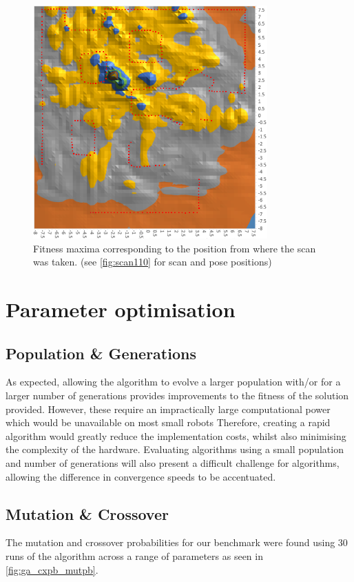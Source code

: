 \documentclass[authoryearcitations]{UoYCSproject}
\begin{document}
\begin{figure}[ht]
\centering
	\includegraphics[width=9cm,keepaspectratio]{images/landscape_overlay.png}
	\caption{Fitness maxima corresponding to the position from where the scan was taken. (see \autoref{fig:scan110} for scan and pose positions)}
	\label{fig:landscape}
\end{figure}

\section{Parameter optimisation}
\subsection{Population \& Generations}
As expected, allowing the algorithm to evolve a larger population with/or for a larger number of generations provides improvements to the fitness of the solution provided. However, these require an impractically large computational power 
which would be unavailable on most small robots 
Therefore, creating a rapid algorithm would greatly reduce the implementation costs, whilst also minimising the complexity of the hardware. Evaluating algorithms using a small population and number of generations will also present a difficult challenge for algorithms, allowing the difference in convergence speeds to be accentuated. 

\subsection{Mutation \& Crossover}
\label{subsec:benchmark_mutpb_cxpb}
The mutation and crossover probabilities for our benchmark were found using 30 runs of the algorithm across a range of parameters as seen in \autoref{fig:ga_cxpb_mutpb}.
\end{document}
